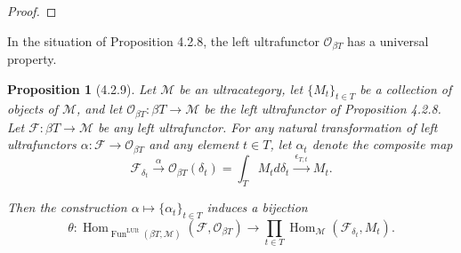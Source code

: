 \documentclass[11pt]{article}
\theoremstyle{plain}
\newtheorem{proposition}{Proposition}
\theoremstyle{definition}
\newcommand{\FunLUlt}{\operatorname{Fun}^{\mathrm{LUlt}}}
\newcommand{\Hom}{\operatorname{Hom}}
\begin{document}
\begin{proof}
\end{proof}

In the situation of Proposition 4.2.8, the left ultrafunctor $\mathcal{O}_{\beta T}$ has a universal property.

\begin{proposition}[4.2.9]
Let $\mathcal{M}$ be an ultracategory, let $\{M_t\}_{t \in T}$ be a collection of objects of $\mathcal{M}$, and let $\mathcal{O}_{\beta T} : \beta T \to \mathcal{M}$ be the left ultrafunctor of Proposition 4.2.8. Let $\mathscr{F} : \beta T \to \mathcal{M}$ be any left ultrafunctor. For any natural transformation of left ultrafunctors $\alpha : \mathscr{F} \to \mathcal{O}_{\beta T}$ and any element $t \in T$, let $\alpha_t$ denote the composite map
\[
\mathscr{F}_{\delta_t} \xrightarrow{\ \alpha\ } \mathcal{O}_{\beta T}(\delta_t) = \int_T M_t d\delta_t \xrightarrow{\ \epsilon_{T,t}\ } M_t.
\]


Then the construction $\alpha \mapsto \{\alpha_t\}_{t \in T}$ induces a bijection
\[
\theta : \Hom_{\FunLUlt(\beta T, \mathcal{M})}(\mathscr{F}, \mathcal{O}_{\beta T}) \to \prod_{t \in T} \Hom_{\mathcal{M}}(\mathscr{F}_{\delta_t}, M_t).
\]
\end{proposition}
\end{document}
